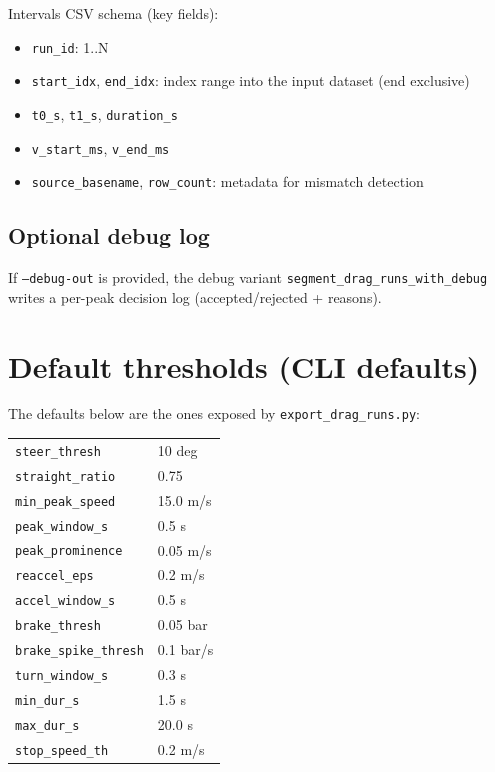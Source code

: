\documentclass[11pt,a4paper]{article}
\begin{document}
Intervals CSV schema (key fields):
\begin{itemize}
  \item \texttt{run\_id}: 1..N
  \item \texttt{start\_idx}, \texttt{end\_idx}: index range into the input dataset (end exclusive)
  \item \texttt{t0\_s}, \texttt{t1\_s}, \texttt{duration\_s}
  \item \texttt{v\_start\_ms}, \texttt{v\_end\_ms}
  \item \texttt{source\_basename}, \texttt{row\_count}: metadata for mismatch detection
\end{itemize}

\subsection*{Optional debug log}
If \texttt{--debug-out} is provided, the debug variant \texttt{segment\_drag\_runs\_with\_debug} writes a per-peak decision log (accepted/rejected + reasons).

\section{Default thresholds (CLI defaults)}
The defaults below are the ones exposed by \texttt{export\_drag\_runs.py}:
\begin{center}
\begin{tabular}{ll}
            	    	\texttt{steer\_thresh} & 10 deg \\
            	    	\texttt{straight\_ratio} & 0.75 \\
            	    	\texttt{min\_peak\_speed} & 15.0 m/s \\
            	    	\texttt{peak\_window\_s} & 0.5 s \\
            	    	\texttt{peak\_prominence} & 0.05 m/s \\
            	    	\texttt{reaccel\_eps} & 0.2 m/s \\
            	    	\texttt{accel\_window\_s} & 0.5 s \\
            	    	\texttt{brake\_thresh} & 0.05 bar \\
            	    	\texttt{brake\_spike\_thresh} & 0.1 bar/s \\
            	    	\texttt{turn\_window\_s} & 0.3 s \\
            	    	\texttt{min\_dur\_s} & 1.5 s \\
            	    	\texttt{max\_dur\_s} & 20.0 s \\
            	    	\texttt{stop\_speed\_th} & 0.2 m/s \\
\end{tabular}
\end{center}
\end{document}
